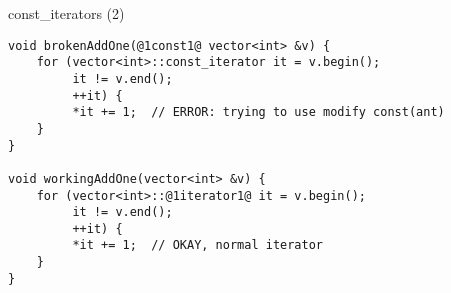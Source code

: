 \begin{frame}[fragile,label=constIt2]{const\_iterators (2)}
\begin{lstlisting}
void brokenAddOne(@1const1@ vector<int> &v) {
    for (vector<int>::const_iterator it = v.begin();
         it != v.end();
         ++it) {
         *it += 1;  // ERROR: trying to use modify const(ant)
    }
}

void workingAddOne(vector<int> &v) {
    for (vector<int>::@1iterator1@ it = v.begin();
         it != v.end();
         ++it) {
         *it += 1;  // OKAY, normal iterator
    }
}
\end{lstlisting}
\end{frame}

